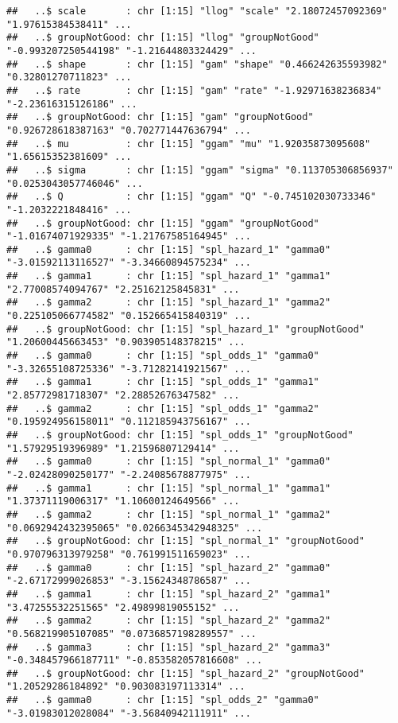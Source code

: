 \documentclass[
]{article}
\begin{document}
\begin{verbatim}
##   ..$ scale       : chr [1:15] "llog" "scale" "2.18072457092369" "1.97615384538411" ...
##   ..$ groupNotGood: chr [1:15] "llog" "groupNotGood" "-0.993207250544198" "-1.21644803324429" ...
##   ..$ shape       : chr [1:15] "gam" "shape" "0.466242635593982" "0.32801270711823" ...
##   ..$ rate        : chr [1:15] "gam" "rate" "-1.92971638236834" "-2.23616315126186" ...
##   ..$ groupNotGood: chr [1:15] "gam" "groupNotGood" "0.926728618387163" "0.702771447636794" ...
##   ..$ mu          : chr [1:15] "ggam" "mu" "1.92035873095608" "1.65615352381609" ...
##   ..$ sigma       : chr [1:15] "ggam" "sigma" "0.113705306856937" "0.0253043057746046" ...
##   ..$ Q           : chr [1:15] "ggam" "Q" "-0.745102030733346" "-1.2032221848416" ...
##   ..$ groupNotGood: chr [1:15] "ggam" "groupNotGood" "-1.01674071929335" "-1.21767585164945" ...
##   ..$ gamma0      : chr [1:15] "spl_hazard_1" "gamma0" "-3.01592113116527" "-3.34660894575234" ...
##   ..$ gamma1      : chr [1:15] "spl_hazard_1" "gamma1" "2.77008574094767" "2.25162125845831" ...
##   ..$ gamma2      : chr [1:15] "spl_hazard_1" "gamma2" "0.225105066774582" "0.152665415840319" ...
##   ..$ groupNotGood: chr [1:15] "spl_hazard_1" "groupNotGood" "1.20600445663453" "0.903905148378215" ...
##   ..$ gamma0      : chr [1:15] "spl_odds_1" "gamma0" "-3.32655108725336" "-3.71282141921567" ...
##   ..$ gamma1      : chr [1:15] "spl_odds_1" "gamma1" "2.85772981718307" "2.28852676347582" ...
##   ..$ gamma2      : chr [1:15] "spl_odds_1" "gamma2" "0.195924956158011" "0.112185943756167" ...
##   ..$ groupNotGood: chr [1:15] "spl_odds_1" "groupNotGood" "1.57929519396989" "1.21596807129414" ...
##   ..$ gamma0      : chr [1:15] "spl_normal_1" "gamma0" "-2.02428090250177" "-2.24085678877975" ...
##   ..$ gamma1      : chr [1:15] "spl_normal_1" "gamma1" "1.37371119006317" "1.10600124649566" ...
##   ..$ gamma2      : chr [1:15] "spl_normal_1" "gamma2" "0.0692942432395065" "0.0266345342948325" ...
##   ..$ groupNotGood: chr [1:15] "spl_normal_1" "groupNotGood" "0.970796313979258" "0.761991511659023" ...
##   ..$ gamma0      : chr [1:15] "spl_hazard_2" "gamma0" "-2.67172999026853" "-3.15624348786587" ...
##   ..$ gamma1      : chr [1:15] "spl_hazard_2" "gamma1" "3.47255532251565" "2.49899819055152" ...
##   ..$ gamma2      : chr [1:15] "spl_hazard_2" "gamma2" "0.568219905107085" "0.0736857198289557" ...
##   ..$ gamma3      : chr [1:15] "spl_hazard_2" "gamma3" "-0.348457966187711" "-0.853582057816608" ...
##   ..$ groupNotGood: chr [1:15] "spl_hazard_2" "groupNotGood" "1.20529286184892" "0.903083197113314" ...
##   ..$ gamma0      : chr [1:15] "spl_odds_2" "gamma0" "-3.01983012028084" "-3.56840942111911" ...

\end{verbatim}
\end{document}
